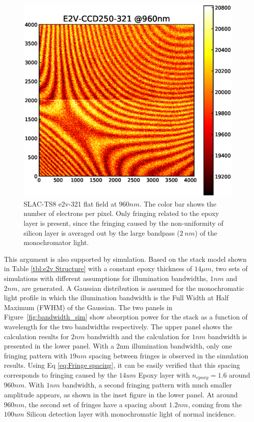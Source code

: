 \documentclass[twocolumn]{aastex63} %
\begin{document}
\begin{CJK*}{UTF8}{gbsn}
\begin{figure}[t]
\centering
\includegraphics[scale = 0.45]{E2V-321-960nm.eps}
\caption{SLAC-TS8 e2v-321 flat field at $960nm$. The color bar shows the number of electrons per pixel. Only fringing related to the epoxy layer is present, since the fringing caused by the non-uniformity of silicon layer is averaged out by the large bandpass ($2\ nm$) of the monochromator light.}
\label{fig:e2v_example}
\end{figure}
This argument is also supported by simulation. Based on the stack model shown in Table \ref{tbl:e2v Structure} with a constant epoxy thickness of $14\mu m$, two sets of simulations with different assumptions for illumination bandwidths, $1nm$ and $2nm$, are generated. A Gaussian distribution is assumed for the monochromatic light profile in which the illumination bandwidth is the Full Width at Half Maximum (FWHM) of the Gaussian. The two panels in Figure~\ref{fig:bandwidth_sim} show absorption power for the stack as a function of wavelength for the two bandwidths respectively. The upper panel shows the calculation results for $2nm$ bandwidth and the calculation for $1nm$ bandwidth is presented in the lower panel. With a 2nm illumination bandwidth, only one fringing pattern with $19nm$ spacing between fringes is observed in the simulation results. Using Eq \ref{eq:Fringe spacing}, it can be easily verified that this spacing corresponds to fringing caused by the $14um$ Epoxy layer with $n_{epoxy} = 1.6$ around $960nm$. With $1nm$ bandwidth, a second fringing pattern with much smaller amplitude appears, as shown in the inset figure in the lower panel. At around $960nm$, the second set of fringes have a spacing about $1.2nm$, coming from the $100um$ Silicon detection layer with monochromatic light of normal incidence.


\end{CJK*}
\end{document}

